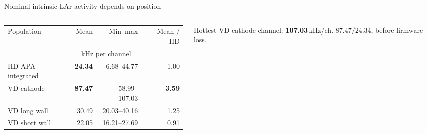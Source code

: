 \documentclass[aspectratio=169,11pt]{beamer}
\newcommand{\rate}[1]{\textbf{#1}\,kHz/ch}
\begin{document}
\begin{frame}{Nominal intrinsic-LAr activity depends on position}
  \begin{columns}[T,onlytextwidth]
    \begin{column}{0.62\textwidth}
      \small
      \setlength{\tabcolsep}{4pt}
      \renewcommand{\arraystretch}{1.24}
      \begin{tabular}{@{}lrrr@{}}
        \toprule
        Population & Mean & Min--max & Mean / HD \\
        & \multicolumn{2}{c}{kHz per channel} & \\
        \midrule
        HD APA-integrated & \textbf{24.34} & 6.68--44.77 & 1.00 \\
        VD cathode & \textbf{87.47} & 58.99--107.03 & \textbf{3.59} \\
        VD long wall & 30.49 & 20.03--40.16 & 1.25 \\
        VD short wall & 22.05 & 16.21--27.69 & 0.91 \\
        \bottomrule
      \end{tabular}
    \end{column}
    \begin{column}{0.34\textwidth}
        {Hottest VD cathode channel: \rate{107.03}.}
      \smallskip
        {\(87.47/24.34\), before firmware loss.}
    \end{column}
  \end{columns}
\end{frame}
\end{document}
